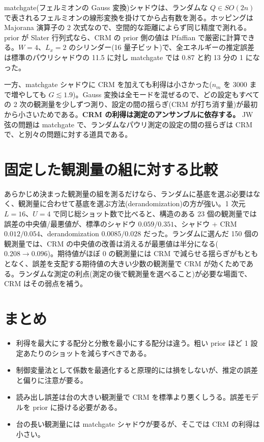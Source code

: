 matchgate(フェルミオンの Gauss 変換)シャドウ\cite{zhao2021,wan2023}は、ランダムな $Q\in SO(2n)$ で表されるフェルミオンの線形変換を掛けてから占有数を測る。ホッピングは Majorana 演算子の 2 次式なので、空間的な距離によらず同じ精度で測れる。prior が Slater 行列式なら、CRM の prior 側の値は Pfaffian で厳密に計算できる。$W=4$、$L_x=2$ のシリンダー(16 量子ビット)で、全エネルギーの推定誤差は標準のパウリシャドウの 11.5 に対し matchgate では 0.87 と約 13 分の 1 になった。

一方、matchgate シャドウに CRM を加えても利得は小さかった($n_m$ を 3000 まで増やしても $G\lesssim1.9$)。Gauss 変換は全モードを混ぜるので、どの設定もすべての 2 次の観測量を少しずつ測り、設定の間の揺らぎ(CRM が打ち消す量)が最初から小さいためである。\textbf{CRM の利得は測定のアンサンブルに依存する。} JW 弦の問題は matchgate で、ランダムなパウリ測定の設定の間の揺らぎは CRM で、と別々の問題に対する道具である。

\section{固定した観測量の組に対する比較}
\label{sec:derand}

あらかじめ決まった観測量の組を測るだけなら、ランダムに基底を選ぶ必要はなく、観測量に合わせて基底を選ぶ方法(derandomization\cite{huang2021})の方が強い。1 次元 $L=16$、$U=4$ で同じ総ショット数で比べると、構造のある 23 個の観測量では誤差の中央値/最悪値が、標準のシャドウ $0.059/0.351$、シャドウ + CRM $0.012/0.054$、derandomization $0.0085/0.028$ だった。ランダムに選んだ 150 個の観測量では、CRM の中央値の改善は消えるが最悪値は半分になる($0.208\to0.096$)。期待値がほぼ 0 の観測量には CRM で減らせる揺らぎがもともとなく、誤差を支配する期待値の大きい少数の観測量で CRM が効くためである。ランダムな測定の利点(測定の後で観測量を選べること)が必要な場面で、CRM はその弱点を補う。

\section{まとめ}
\begin{itemize}
  \item 利得を最大にする配分と分散を最小にする配分は違う。粗い prior ほど 1 設定あたりのショットを減らすべきである。
  \item 制御変量法として係数を最適化すると原理的には損をしないが、推定の誤差と偏りに注意が要る。
  \item 読み出し誤差は台の大きい観測量で CRM を標準より悪くしうる。誤差モデルを prior に掛ける必要がある。
  \item 台の長い観測量には matchgate シャドウが要るが、そこでは CRM の利得は小さい。
\end{itemize}
